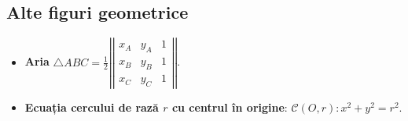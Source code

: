 \documentclass{article}
\begin{document}
\subsection*{Alte figuri geometrice}
\begin{itemize}
    \item \textbf{Aria} $\triangle ABC = \frac{1}{2}\left|\left|\begin{matrix}
        x_A & y_A & 1 \\
        x_B & y_B & 1 \\
        x_C & y_C & 1
    \end{matrix}\right|\right|$.
    \item \textbf{Ecuația cercului de rază $r$ cu centrul în origine}: $\mathcal{C}(O, r): x^2+y^2=r^2$.
\end{itemize}
\end{document}
